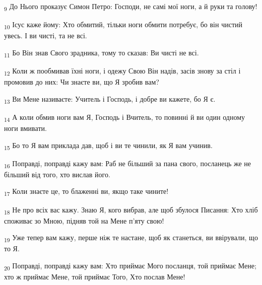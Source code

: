 \begin{tcolorbox}
\textsubscript{9} До Нього проказує Симон Петро: Господи, не самі мої ноги, а й руки та голову!
\end{tcolorbox}
\begin{tcolorbox}
\textsubscript{10} Ісус каже йому: Хто обмитий, тільки ноги обмити потребує, бо він чистий увесь. І ви чисті, та не всі.
\end{tcolorbox}
\begin{tcolorbox}
\textsubscript{11} Бо Він знав Свого зрадника, тому то сказав: Ви чисті не всі.
\end{tcolorbox}
\begin{tcolorbox}
\textsubscript{12} Коли ж пообмивав їхні ноги, і одежу Свою Він надів, засів знову за стіл і промовив до них: Чи знаєте ви, що Я зробив вам?
\end{tcolorbox}
\begin{tcolorbox}
\textsubscript{13} Ви Мене називаєте: Учитель і Господь, і добре ви кажете, бо Я є.
\end{tcolorbox}
\begin{tcolorbox}
\textsubscript{14} А коли обмив ноги вам Я, Господь і Вчитель, то повинні й ви один одному ноги вмивати.
\end{tcolorbox}
\begin{tcolorbox}
\textsubscript{15} Бо то Я вам приклада дав, щоб і ви те чинили, як Я вам учинив.
\end{tcolorbox}
\begin{tcolorbox}
\textsubscript{16} Поправді, поправді кажу вам: Раб не більший за пана свого, посланець же не більший від того, хто вислав його.
\end{tcolorbox}
\begin{tcolorbox}
\textsubscript{17} Коли знаєте це, то блаженні ви, якщо таке чините!
\end{tcolorbox}
\begin{tcolorbox}
\textsubscript{18} Не про всіх вас кажу. Знаю Я, кого вибрав, але щоб збулося Писання: Хто хліб споживає зо Мною, підняв той на Мене п'яту свою!
\end{tcolorbox}
\begin{tcolorbox}
\textsubscript{19} Уже тепер вам кажу, перше ніж те настане, щоб як станеться, ви ввірували, що то Я.
\end{tcolorbox}
\begin{tcolorbox}
\textsubscript{20} Поправді, поправді кажу вам: Хто приймає Мого посланця, той приймає Мене; хто ж приймає Мене, той приймає Того, Хто послав Мене!
\end{tcolorbox}
